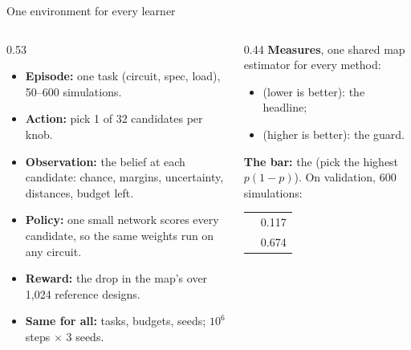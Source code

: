 \begin{frame}{One environment for every learner}
  \begin{columns}[T]
    \begin{column}{0.53\textwidth}
      \small
      \begin{itemize}
        \item \textbf{Episode:} one task (circuit, spec, load), 50--600 simulations.
        \item \textbf{Action:} pick 1 of 32 candidates per knob.
        \item \textbf{Observation:} the belief at each candidate: chance, margins, uncertainty, distances, budget left.
        \item \textbf{Policy:} one small network scores every candidate, so the same weights run on any circuit.
        \item \textbf{Reward:} the drop in the map's \prederr{} over 1,024 reference designs.
        \item \textbf{Same for all:} tasks, budgets, seeds; $10^6$ steps $\times$ 3 seeds.
      \end{itemize}
    \end{column}
    \begin{column}{0.44\textwidth}
      \small
      \textbf{Measures}, one shared map estimator for every method:
      \begin{itemize}
        \item \prederr{} (lower is better): the headline;
        \item \passfail{} (higher is better): the guard.
      \end{itemize}
      \vspace{1mm}
      \textbf{The bar:} the  (pick the highest $p(1-p)$). On validation, 600 simulations:
      \vspace{1mm}

      \centering
      \begin{tabular}{@{}lc@{}}
        \toprule
        \prederr{} & 0.117 \\
        \passfail{} & 0.674 \\
        \bottomrule
      \end{tabular}
    \end{column}
  \end{columns}
\end{frame}

